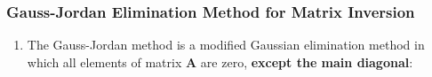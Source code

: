 \documentclass[10pt,compress]{beamer}
\begin{document}
\begin{frame}
  \frametitle{Gauss-Jordan Elimination Method for Matrix Inversion} 
  \begin{enumerate}
     \item <1-> The Gauss-Jordan method is a modified Gaussian elimination method in which all elements of matrix $\bm{A}$ are zero, {\bf except the main diagonal}:


\end{enumerate}
\end{frame}
\end{document}
